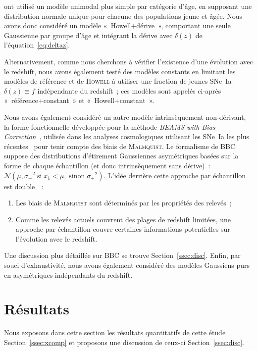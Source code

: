 \documentclass[../main/main.tex]{subfiles}
\begin{document}
\cite{howell2007} ont utilisé un modèle unimodal plus simple par catégorie
d'âge, en supposant une distribution normale unique pour chacune des populations
jeune et âgée. Nous avons donc considéré un modèle «~Howell+dérive~», comportant
une seule Gaussienne par groupe d'âge et intégrant la dérive avec $\delta(z)$ de
l'équation~\ref{eq:deltaz}.

Alternativement, comme nous cherchons à vérifier l'existence d'une évolution
avec le redshift, nous avons également testé des modèles constants en limitant
les modèles de référence et de \textsc{Howell} à utiliser une fraction de jeunes
SNe~Ia $\delta(z) \equiv f$ indépendante du redshift~; ces modèles sont appelés
ci-après «~référence+constant~» et «~Howell+constant~».

Nous avons également considéré un autre modèle intrinsèquement non-dérivant, la
forme fonctionnelle développée pour la méthode \textit{BEAMS with Bias
Correction}~\citep[BBC,][]{scolnic2016, kessler2017}, utilisée dans les analyses
cosmologiques utilisant les SNe~Ia les plus récentes~\citep[par
exemple][]{scolnic2018, abbott2019, riess2016, riess2019} pour tenir compte des
biais de \textsc{Malmquist}. Le formalisme de BBC suppose des distributions
d'étirement Gaussiennes asymétriques basées sur la forme de chaque échantillon
(et donc intrinsèquement sans dérive)~: $\mathcal{N}\left(\mu, \sigma_-{}^2\;
\text{si} \;x_1<\mu,\; \text{sinon} \;\sigma_+{}^2\right)$. L'idée derrière
cette approche par échantillon est double~\citep{scolnic2016, scolnic2018}~:
\begin{enumerate}
    \item Les biais de \textsc{Malmquist} sont déterminés par les propriétés des
        relevés~;
    \item Comme les relevés actuels couvrent des plages de redshift limitées,
        une approche par échantillon couvre certaines informations potentielles
        sur l'évolution avec le redshift.
\end{enumerate}
Une discussion plus détaillée sur BBC se trouve Section~\ref{ssec:disc}. Enfin,
par souci d'exhaustivité, nous avons également considéré des modèles Gaussiens
purs en asymétriques indépendants du redshift.

\section{Résultats}\label{sec:xres}

Nous exposons dans cette section les résultats quantitatifs de cette étude
Section~\ref{ssec:xcomp} et proposons une discussion de ceux-ci
Section~\ref{ssec:disc}.
\end{document}
